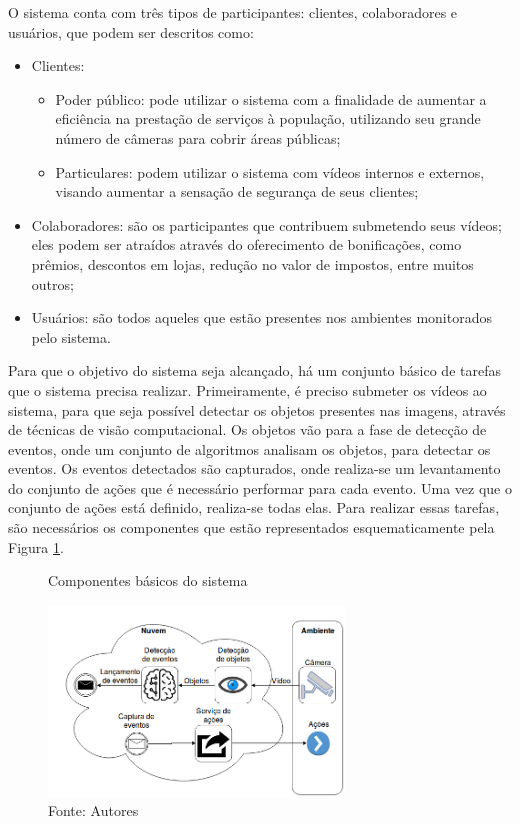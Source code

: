 \documentclass[]{politex}
\begin{document}
O sistema conta com três tipos de participantes: clientes, colaboradores e usuários, que podem ser descritos como:

\begin{itemize}
    \item Clientes:
    \begin{itemize}
        \item Poder público: pode utilizar o sistema com a finalidade de aumentar a eficiência na prestação de serviços à população, utilizando seu grande número de câmeras para cobrir áreas públicas;
        \item Particulares: podem utilizar o sistema com vídeos internos e externos, visando aumentar a sensação de segurança de seus clientes;
    \end{itemize}
    \item Colaboradores: são os participantes que contribuem submetendo seus vídeos; eles podem ser atraídos através do oferecimento de bonificações, como prêmios, descontos em lojas, redução no valor de impostos, entre muitos outros;
    \item Usuários: são todos aqueles que estão presentes nos ambientes monitorados pelo sistema.
\end{itemize}

Para que o objetivo do sistema seja alcançado, há um conjunto básico de tarefas que o sistema precisa realizar. Primeiramente, é preciso submeter os vídeos ao sistema, para que seja possível detectar os objetos presentes nas imagens, através de técnicas de visão computacional. Os objetos vão para a fase de detecção de eventos, onde um conjunto de algoritmos analisam os objetos, para detectar os eventos. Os eventos detectados são capturados, onde realiza-se um levantamento do conjunto de ações que é necessário performar para cada evento. Uma vez que o conjunto de ações está definido, realiza-se todas elas.  Para realizar essas tarefas, são necessários os componentes que estão representados esquematicamente pela Figura \ref{fig:componentes}.

\begin{figure}[H]
    \centering
    \caption{Componentes básicos do sistema}
    \includegraphics[width=0.7\textwidth]{Componentes_basicos}
    \caption*{Fonte: Autores}
    \label{fig:componentes}
\end{figure}
\end{document}
